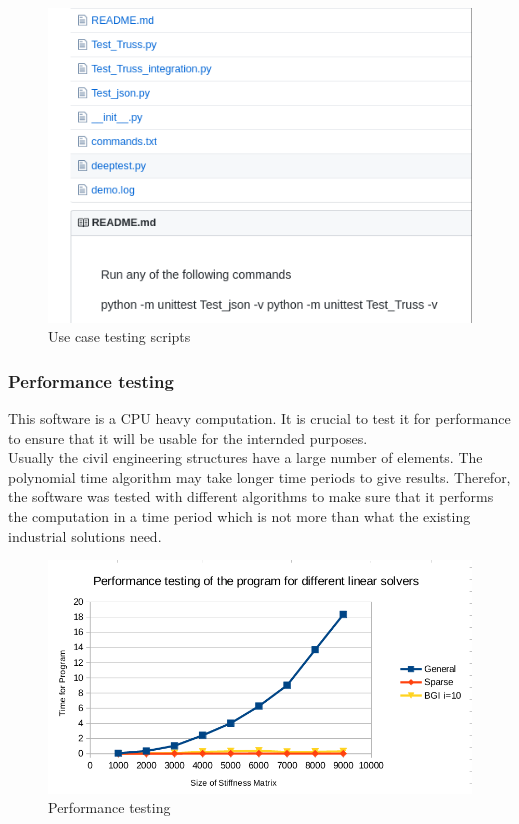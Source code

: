 \documentclass[12pt]{article}
\begin{document}
\begin{figure}[H]
    \centering
    \includegraphics[scale=0.4]{images/tests.png}
    \caption{Use case testing scripts}
    \label{fig:my_label}
\end{figure}

\subsubsection{Performance testing}

This software is a CPU heavy computation. It is crucial to test it for performance to ensure that it will be usable for the internded purposes.\\Usually the civil engineering structures have a large number of elements. The polynomial time algorithm may take longer time periods to give results. Therefor, the software was tested with different algorithms to make sure that it performs the computation in a time period which is not more than what the existing industrial solutions need.\\ 

\begin{figure}[H]
    \centering
    \includegraphics[scale=0.5]{images/performance}
    \caption{Performance testing}
    \label{fig:my_label}
\end{figure}
\end{document}
